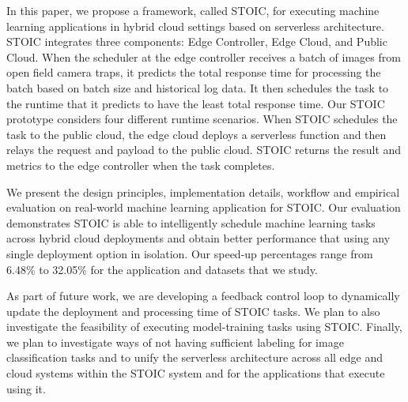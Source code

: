 In this paper, we propose a framework, called STOIC, for executing machine learning applications in hybrid cloud settings based on serverless architecture. STOIC integrates three components: Edge Controller, Edge Cloud, and Public Cloud. When the scheduler at the edge controller receives a batch of images from open field camera traps, it predicts the total response time for processing the batch based on batch size and historical log data. It then schedules the task to the runtime that it predicts to have the least total response time.  Our STOIC prototype considers four different runtime scenarios. When STOIC schedules the task to the public cloud, the edge cloud deploys a serverless function and then relays the request and payload to the public cloud. STOIC returns the result and metrics to the edge controller when the task completes.

We present the design principles, implementation details, workflow and empirical evaluation on real-world machine learning application for STOIC. Our evaluation demonstrates STOIC is able to intelligently schedule machine learning tasks across hybrid cloud deployments and obtain better performance that using any single deployment option in isolation.  Our speed-up percentages range from 6.48\% to 32.05\% for the application and datasets that we study.

As part of future work, we are developing a feedback control loop to dynamically update the deployment and processing time of STOIC tasks. We plan to also investigate the feasibility of executing model-training tasks using STOIC. Finally, we plan to investigate ways of not having sufficient labeling for image classification tasks and to unify the serverless architecture across all edge and cloud systems within the STOIC system and for the applications that execute using it.
